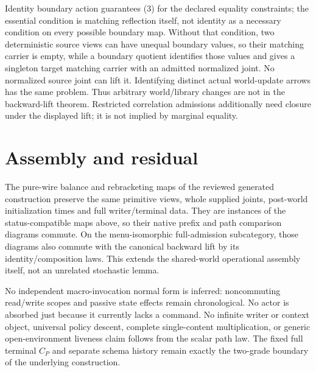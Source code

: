 \documentclass[11pt]{article}
\begin{document}
Identity boundary action guarantees (3) for the declared equality constraints;
the essential condition is matching reflection itself, not identity as a
necessary condition on every possible boundary map. Without that condition,
two deterministic source
views can have unequal boundary values, so their matching carrier is empty,
while a boundary quotient identifies those values and gives a singleton
target matching carrier with an admitted normalized joint. No normalized
source joint can lift it. Identifying distinct actual world-update arrows
has the same problem. Thus arbitrary world/library changes are not in the
backward-lift theorem. Restricted correlation admissions additionally need
closure under the displayed lift; it is not implied by marginal equality.

\section{Assembly and residual}
The pure-wire balance and rebracketing maps of the reviewed generated
construction preserve the same primitive views, whole supplied joints,
post-world initialization times and full writer/terminal data. They are
instances of the status-compatible maps above, so their native prefix and
path comparison diagrams commute. On the menu-isomorphic full-admission
subcategory, those diagrams also commute with the canonical backward lift
by its identity/composition laws. This extends the shared-world operational
assembly itself, not an unrelated stochastic lemma.

No independent macro-invocation normal form is inferred: noncommuting
read/write scopes and passive state effects remain chronological. No actor
is absorbed just because it currently lacks a command. No infinite writer
or context object, universal policy descent, complete single-content
multiplication, or generic open-environment liveness claim follows from the
scalar path law. The fixed full terminal $C_P$ and separate schema history
remain exactly the two-grade boundary of the underlying construction.
\end{document}
